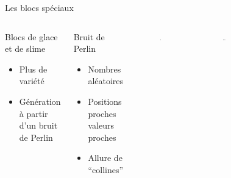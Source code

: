 \documentclass{beamer}
\begin{document}
{\begin{frame}{Les blocs spéciaux}
    \begin{columns}
        \begin{block}{Blocs de glace et de slime}
            \begin{itemize}
                \item[\bullet] Plus de variété
                \item[\bullet] Génération à partir d'un bruit de Perlin
            \end{itemize}
        \end{block}
        \begin{block}{Bruit de Perlin}
            \begin{itemize}
                \item[\bullet] Nombres aléatoires
                \item[\bullet] Positions proches \eq valeurs proches
                \item[\bullet] Allure de ``collines''
            \end{itemize}
        \end{block}
        \begin{figure}
            \centering
            \includegraphics[width=0.4\textwidth]{perlin_noise_example}
        \end{figure}
        \begin{figure}
            \centering
            \includegraphics[width=1.0\textwidth]{perlin_noise_gradient}
        \end{figure}
        \begin{figure}
            \centering

\end{figure}
\end{columns}
\end{frame}}
\end{document}
